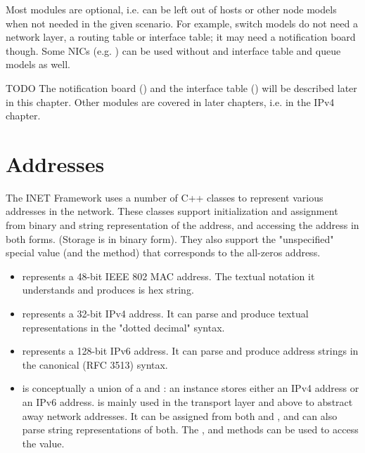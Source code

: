 Most modules are optional, i.e. can be left out of hosts or other node
models when not needed in the given scenario. For example, switch models do
not need a network layer, a routing table or interface table; it may need a
notification board though. Some NICs (e.g. ) can be used
without and interface table and queue models as well.

\ifdraft TODO
The notification board () and the interface
table () will be described later in this chapter.
Other modules are covered in later chapters, i.e. 
in the IPv4 chapter.
\fi

\section{Addresses}

The INET Framework uses a number of C++ classes to represent various
addresses in the network. These classes support initialization and
assignment from binary and string representation of the address, and
accessing the address in both forms. (Storage is in binary form). They also
support the "unspecified" special value (and the 
method) that corresponds to the all-zeros address.

\begin{itemize}
  \item {} represents a 48-bit IEEE 802 MAC address. The
    textual notation it understands and produces is hex string.

  \item {} represents a 32-bit IPv4 address. It can parse
    and produce textual representations in the "dotted decimal" syntax.

  \item {} represents a 128-bit IPv6 address. It can parse
    and produce address strings in the canonical (RFC 3513) syntax.

  \item {} is conceptually a union of a 
    and : an instance stores either an IPv4 address or an
    IPv6 address.  is mainly used in the transport layer and above
    to abstract away network addresses. It can be assigned from both 
    and , and can also parse string representations of both.
    The ,  and  methods can be used
    to access the value.
\end{itemize}

